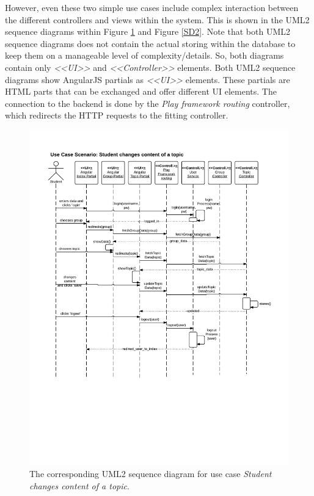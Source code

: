However, even these two simple use cases include complex interaction between the different controllers and views within the system. This is shown in the \ac{UML2} sequence diagrams within Figure \ref{SD1} and Figure \ref{SD2}. Note that both \ac{UML2} sequence diagrams does not contain the actual storing within the database to keep them on a manageable level of complexity/details. So, both diagrams contain only \emph{<<UI>>} and \emph{<<Controller>>} elements. Both \ac{UML2} sequence diagrams show AngularJS partials as \emph{<<UI>>} elements. These partials are \ac{HTML} parts that can be exchanged and offer different \ac{UI} elements. The connection to the backend is done by the \emph{Play framework routing} controller, which redirects the \ac{HTTP} requests to the fitting controller.

\begin{figure}[th]
\centerline{\includegraphics[width=1\textwidth]{gfx/SDChangeContent}}
\caption{The corresponding \ac{UML2} sequence diagram for use case \glqq\emph{Student changes content of a topic}\grqq.}
\label{SD1}
\end{figure} 


